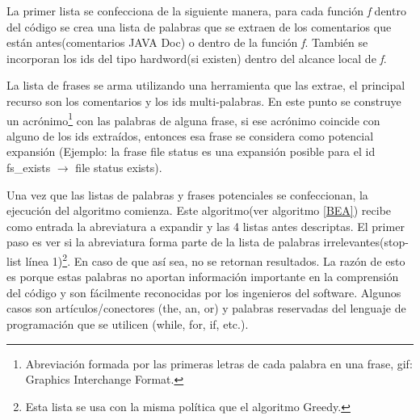 \documentclass[a4paper,12pt]{report}
\begin{document}
La primer lista se confecciona de la siguiente manera, para cada función \textit{f} dentro del código se crea una lista de palabras que se extraen de los comentarios que están antes(comentarios JAVA Doc) o dentro de la función \textit{f}. También se incorporan los ids del tipo hardword(si existen) dentro del alcance local de \textit{f}. 

La lista de frases se arma utilizando una herramienta que las extrae\cite{FFCW01}, el principal recurso son los comentarios y los ids multi-palabras. En este punto se construye un acrónimo\footnote[1]{Abreviación formada por las primeras letras de cada palabra en una frase, gif: Graphics Interchange Format.} con las palabras de alguna frase, si ese acrónimo coincide con alguno de los ids extraídos, entonces esa frase se considera como potencial expansión (Ejemplo: la frase \textsf{file status} es una expansión posible para el id \textsf{fs\_exists} $\rightarrow$ \textsf{file status exists}).

Una vez que las listas de palabras y frases potenciales se confeccionan, la ejecución del algoritmo comienza. Este algoritmo(ver algoritmo \ref{BEA}) recibe como entrada la abreviatura a expandir y las 4 listas antes descriptas. El primer paso es ver si la abreviatura forma parte de la lista de palabras irrelevantes(stop-list línea 1)\footnote[2]{Esta lista se usa con la misma política que el algoritmo Greedy.}. En caso de que así sea, no se retornan resultados. La razón de esto es porque estas palabras no aportan información importante en la comprensión del código y son fácilmente reconocidas por los ingenieros del software. Algunos casos son artículos/conectores (the, an, or) y palabras reservadas del lenguaje de programación que se utilicen (\textsf{while, for, if,} etc.).
\end{document}
